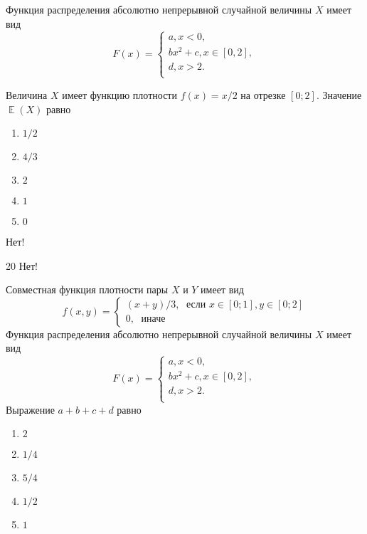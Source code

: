 \documentclass[t]{beamer}
\DeclareMathOperator{\E}{\mathbb{E}}
\begin{document}
 \begin{frame} \label{19-No} 
\begin{block}{19} 

Функция распределения абсолютно непрерывной случайной величины $X$ имеет вид
\[
F(x)=\begin{cases}
a, x<0,\\
b x^2+c, x \in [0,2],\\
d, x > 2.\\
\end{cases}
\]
\vspace{0.2cm} 
 
Величина $X$ имеет функцию плотности $f(x)=x/2$ на отрезке $[0;2]$. Значение $\E(X)$  равно
 


 \end{block} 
\begin{enumerate} 
\item[] \hyperlink{19-No}{\beamergotobutton{} $1/2$}
\item[] \hyperlink{19-Yes}{\beamergotobutton{} $4/3$}
\item[] \hyperlink{19-No}{\beamergotobutton{} $2$
}
\item[] \hyperlink{19-No}{\beamergotobutton{} $1$}
\item[] \hyperlink{19-No}{\beamergotobutton{} $0$}
\end{enumerate} 

 \alert{Нет!} 
\end{frame} 


 \begin{frame} \label{20-No} 
\begin{block}{20  \alert{Нет!} } 

Совместная функция плотности пары $X$ и $Y$ имеет вид
\[
f(x,y)=\begin{cases}
(x+y)/3, \; \text{ если } x\in[0;1], y\in [0;2] \\
0, \; \text{ иначе}
\end{cases}
\]
Функция распределения абсолютно непрерывной случайной величины $X$ имеет вид
\[
F(x)=\begin{cases}
a, x<0,\\
b x^2+c, x \in [0,2],\\
d, x > 2.\\
\end{cases}
\]
Выражение $a+b+c+d$ равно
 


 \end{block} 
\begin{enumerate} 
\item[] \hyperlink{20-No}{\beamergotobutton{} $2$
}
\item[] \hyperlink{20-No}{\beamergotobutton{} $1/4$}
\item[] \hyperlink{20-Yes}{\beamergotobutton{} $5/4$}
\item[] \hyperlink{20-No}{\beamergotobutton{} $1/2$}
\item[] \hyperlink{20-No}{\beamergotobutton{} $1$}
\end{enumerate} 
\end{frame} 
\end{document}

